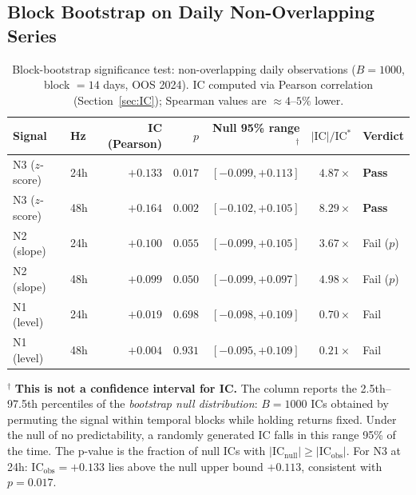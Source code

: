 \documentclass[12pt, a4paper]{article}
\theoremstyle{plain}
\theoremstyle{definition}
\newcommand{\IC}{\mathrm{IC}}
\begin{document}
\subsection{Block Bootstrap on Daily Non-Overlapping Series}
\label{sec:boot_results}

\begin{table}[H]
\centering
\caption{Block-bootstrap significance test: non-overlapping daily observations
($B=1000$, block $=14$ days, OOS 2024). IC computed via Pearson correlation
(Section~\ref{sec:IC}); Spearman values are $\approx\!4$--$5\%$ lower.}
\label{tab:n3_rigorous}
\begin{tabular}{llrrrrl}
\toprule
Signal & Hz & IC (Pearson) & $p$ & Null 95\% range$^\dagger$ & $|\IC|/\IC^*$ & Verdict \\
\midrule
N3 ($z$-score) & 24h & $+0.133$ & $\mathbf{0.017}$ & $[-0.099, +0.113]$ & $4.87\times$ & \textbf{Pass} \\
N3 ($z$-score) & 48h & $+0.164$ & $\mathbf{0.002}$ & $[-0.102, +0.105]$ & $8.29\times$ & \textbf{Pass} \\
N2 (slope)     & 24h & $+0.100$ & $0.055$           & $[-0.099, +0.105]$ & $3.67\times$ & Fail ($p$) \\
N2 (slope)     & 48h & $+0.099$ & $0.050$           & $[-0.099, +0.097]$ & $4.98\times$ & Fail ($p$) \\
N1 (level)     & 24h & $+0.019$ & $0.698$           & $[-0.098, +0.109]$ & $0.70\times$ & Fail \\
N1 (level)     & 48h & $+0.004$ & $0.931$           & $[-0.095, +0.109]$ & $0.21\times$ & Fail \\
\bottomrule
\end{tabular}
\smallskip

\begin{minipage}{0.92\textwidth}
\footnotesize $^\dagger$ \textbf{This is not a confidence interval for IC.}
The column reports the 2.5th--97.5th percentiles of the \emph{bootstrap
null distribution}: $B = 1000$ ICs obtained by permuting the signal
within temporal blocks while holding returns fixed.  Under the null
of no predictability, a randomly generated IC falls in this range
95\% of the time.  The p-value is the fraction of null ICs with
$|\mathrm{IC}_\text{null}| \geq |\mathrm{IC}_\text{obs}|$.
For N3 at 24h: $\mathrm{IC}_\text{obs} = +0.133$ lies above the
null upper bound $+0.113$, consistent with $p = 0.017$.
\end{minipage}
\end{table}
\end{document}
